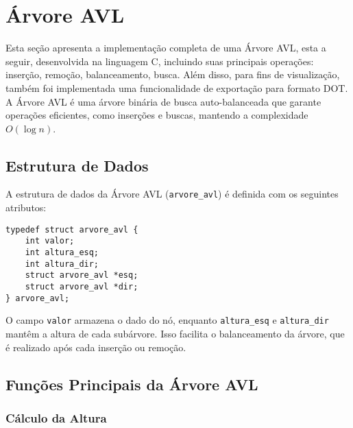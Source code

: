 \section{Árvore AVL}

Esta seção apresenta a implementação completa de uma Árvore AVL, esta a seguir, desenvolvida na linguagem C,
incluindo suas principais operações: inserção, remoção, balanceamento, busca. 
Além disso, para fins de visualização, também foi implementada uma funcionalidade de exportação para formato DOT.
A Árvore AVL é uma árvore binária de busca auto-balanceada que garante operações eficientes, como inserções e buscas, mantendo a complexidade \(O(\log n)\).

\vspace{3mm}

\subsection{Estrutura de Dados}

\vspace{3mm}

A estrutura de dados da Árvore AVL (\texttt{arvore\_avl}) é definida com os seguintes atributos:

\begin{lstlisting}
typedef struct arvore_avl {
    int valor;                
    int altura_esq;           
    int altura_dir;           
    struct arvore_avl *esq;   
    struct arvore_avl *dir;   
} arvore_avl;
\end{lstlisting}

O campo \texttt{valor} armazena o dado do nó, enquanto \texttt{altura\_esq} e \texttt{altura\_dir} mantêm a altura de cada subárvore. 
Isso facilita o balanceamento da árvore, que é realizado após cada inserção ou remoção.

\vspace{3mm}

\subsection{Funções Principais da Árvore AVL}

\vspace{3mm}

\subsubsection{Cálculo da Altura}

\vspace{3mm}

